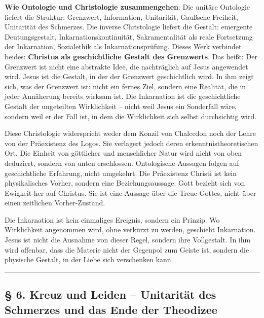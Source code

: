 \documentclass[
  ngerman,
]{article}
\begin{document}
\textbf{Wie Ontologie und Christologie zusammengehen}: Die unitäre
Ontologie liefert die Struktur: Grenzwert, Information, Unitarität,
Gaußsche Freiheit, Unitarität des Schmerzes. Die inverse Christologie
liefert die Gestalt: emergente Deutungsgestalt, Inkarnationskontinuität,
Sakramentalität als reale Fortsetzung der Inkarnation, Sozialethik als
Inkarnationsprüfung. Dieses Werk verbindet beides: \textbf{Christus als
geschichtliche Gestalt des Grenzwerts}. Das heißt: Der Grenzwert ist
nicht eine abstrakte Idee, die nachträglich auf Jesus angewendet wird.
Jesus ist die Gestalt, in der der Grenzwert geschichtlich wird. In ihm
zeigt sich, was der Grenzwert ist: nicht ein fernes Ziel, sondern eine
Realität, die in jeder Annäherung bereits wirksam ist. Die Inkarnation
ist die geschichtliche Gestalt der ungeteilten Wirklichkeit -- nicht
weil Jesus ein Sonderfall wäre, sondern weil er der Fall ist, in dem die
Wirklichkeit sich selbst durchsichtig wird.

Diese Christologie widerspricht weder dem Konzil von Chalcedon noch der
Lehre von der Präexistenz des Logos. Sie verlagert jedoch deren
erkenntnistheoretischen Ort. Die Einheit von göttlicher und menschlicher
Natur wird nicht von oben deduziert, sondern von unten erschlossen.
Ontologische Aussagen folgen auf geschichtliche Erfahrung, nicht
umgekehrt. Die Präexistenz Christi ist kein physikalisches Vorher,
sondern eine Beziehungsaussage: Gott bezieht sich von Ewigkeit her auf
Christus. Sie ist eine Aussage über die Treue Gottes, nicht über einen
zeitlichen Vorher-Zustand.

Die Inkarnation ist kein einmaliges Ereignis, sondern ein Prinzip. Wo
Wirklichkeit angenommen wird, ohne verkürzt zu werden, geschieht
Inkarnation. Jesus ist nicht die Ausnahme von dieser Regel, sondern ihre
Vollgestalt. In ihm wird offenbar, dass die Materie nicht der Gegenpol
zum Geiste ist, sondern die physische Gestalt, in der Liebe sich
verschenken kann.

\begin{center}\rule{0.5\linewidth}{0.5pt}\end{center}

\subsection{§ 6. Kreuz und Leiden -- Unitarität des Schmerzes und das
Ende der
Theodizee}\label{kreuz-und-leiden-unitarituxe4t-des-schmerzes-und-das-ende-der-theodizee}
\end{document}
